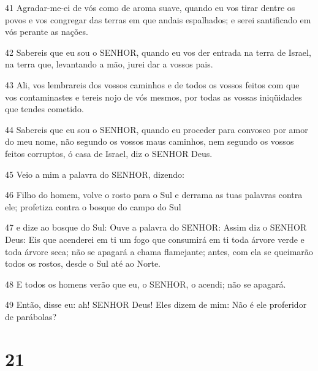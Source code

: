 \par 41 Agradar-me-ei de vós como de aroma suave, quando eu vos tirar dentre os povos e vos congregar das terras em que andais espalhados; e serei santificado em vós perante as nações.
\par 42 Sabereis que eu sou o SENHOR, quando eu vos der entrada na terra de Israel, na terra que, levantando a mão, jurei dar a vossos pais.
\par 43 Ali, vos lembrareis dos vossos caminhos e de todos os vossos feitos com que vos contaminastes e tereis nojo de vós mesmos, por todas as vossas iniqüidades que tendes cometido.
\par 44 Sabereis que eu sou o SENHOR, quando eu proceder para convosco por amor do meu nome, não segundo os vossos maus caminhos, nem segundo os vossos feitos corruptos, ó casa de Israel, diz o SENHOR Deus.
\par 45 Veio a mim a palavra do SENHOR, dizendo:
\par 46 Filho do homem, volve o rosto para o Sul e derrama as tuas palavras contra ele; profetiza contra o bosque do campo do Sul
\par 47 e dize ao bosque do Sul: Ouve a palavra do SENHOR: Assim diz o SENHOR Deus: Eis que acenderei em ti um fogo que consumirá em ti toda árvore verde e toda árvore seca; não se apagará a chama flamejante; antes, com ela se queimarão todos os rostos, desde o Sul até ao Norte.
\par 48 E todos os homens verão que eu, o SENHOR, o acendi; não se apagará.
\par 49 Então, disse eu: ah! SENHOR Deus! Eles dizem de mim: Não é ele proferidor de parábolas?

\chapter{21}

